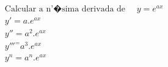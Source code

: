 \begin{ex}
\begin{align}
&\text{Calcular a n'�sima derivada de }\quad y=e^{ax}\nonumber\\
&y'=a.e^{ax}\nonumber\\
&y''=a^2.e^{ax}\nonumber\\
&y'''^=a^3.e^{ax}\nonumber\\
&y^{n}=a^{n}.e^{ax}\nonumber
\end{align}
\end{ex}